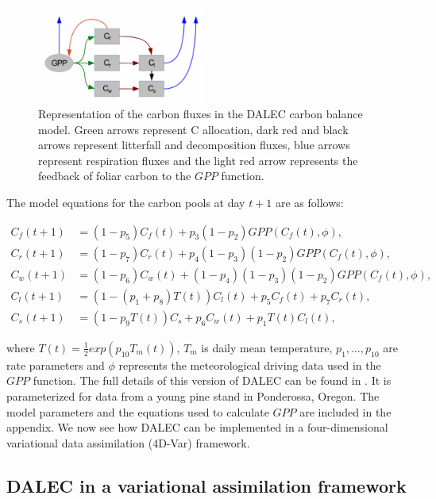 \documentclass[11pt]{article}
\begin{document}
\begin{figure}[h]
    \centering
    \includegraphics[width=0.5\textwidth]{DALECpic.png}
    \caption{Representation of the carbon fluxes in the DALEC carbon balance model. Green arrows represent C allocation, dark red and black arrows represent litterfall and decomposition fluxes, blue arrows represent respiration fluxes and the light red arrow represents the feedback of foliar carbon to the $GPP$ function. \cite{delahaies2013regularization}}
    \label{fig:DALEC_mod}
\end{figure}

The model equations for the carbon pools at day $t+1$ are as follows:

\begin{align}
C_f(t+1)&=(1-p_5)C_f(t)+p_3(1-p_2)GPP(C_f(t),\phi), \label{dalec1}
\\C_r(t+1)&=(1-p_7)C_r(t)+p_4(1-p_3)(1-p_2)GPP(C_f(t),\phi), 
\\C_w(t+1)&=(1-p_6)C_w(t)+(1-p_4)(1-p_3)(1-p_2)GPP(C_f(t),\phi), 
\\C_l(t+1)&=(1-(p_1+p_8)T(t))C_l(t)+p_5C_f(t)+p_7C_r(t), 
\\C_s(t+1)&=(1-p_9T(t))C_s+p_6C_w(t)+p_1T(t)C_l(t), \label{dalec5}
\end{align}

where $T(t)=\frac{1}{2}exp(p_{10}T_m(t))$, $T_m$ is daily mean temperature, $p_1,\ldots,p_{10}$ are rate parameters and $\phi$ represents the meteorological driving data used in the $GPP$ function. The full details of this version of DALEC can be found in \cite{williams2005improved}. It is parameterized for data from a young pine stand in Ponderossa, Oregon. The model parameters and the equations used to calculate $GPP$ are included in the appendix. We now see how DALEC can be implemented in a four-dimensional variational data assimilation (4D-Var) framework.

\subsection{DALEC in a variational assimilation framework}\label{4dvardalec}%
\end{document}
